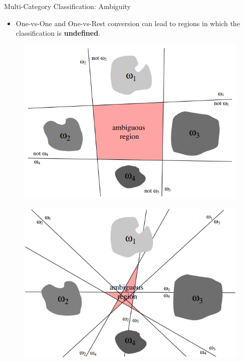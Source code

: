 \documentclass[serif, aspectratio=169]{beamer}
\begin{document}
\begin{frame}{Multi-Category Classification: Ambiguity}
    \begin{itemize}
        \item \justifying One-vs-One and One-vs-Rest conversion can lead to regions in which the classification is \textbf{undefined}.
    \end{itemize}
    \vfill
    \begin{figure}[bh]
        \centering
        \includegraphics[width=\linewidth]{pic/Figure_6.png}
    \end{figure}
    \endminipage
    \begin{figure}[bh]
        \centering
        \includegraphics[width=\linewidth]{pic/Figure_7.png}
    \end{figure}
    \endminipage
    \vfill
\end{frame}
\end{document}
